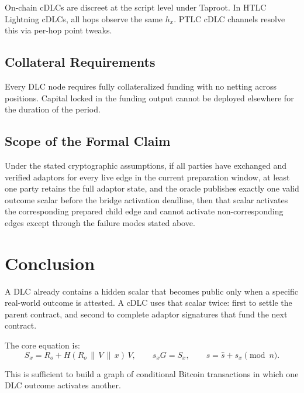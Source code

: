 \documentclass[11pt,a4paper]{article}
\theoremstyle{claimstyle}
\begin{document}
On-chain cDLCs are discreet at the script level under Taproot. In HTLC
Lightning cDLCs, all hops observe the same $h_x$. PTLC cDLC channels resolve
this via per-hop point tweaks.

\subsection{Collateral Requirements}

Every DLC node requires fully collateralized funding with no netting across
positions. Capital locked in the funding output cannot be deployed elsewhere for
the duration of the period.

\subsection{Scope of the Formal Claim}

Under the stated cryptographic assumptions, if all parties have exchanged and
verified adaptors for every live edge in the current preparation window, at
least one party retains the full adaptor state, and the oracle publishes exactly
one valid outcome scalar before the bridge activation deadline, then that scalar
activates the corresponding prepared child edge and cannot activate
non-corresponding edges except through the failure modes stated above.

\section{Conclusion}

A DLC already contains a hidden scalar that becomes public only when a specific
real-world outcome is attested. A cDLC uses that scalar twice: first to settle
the parent contract, and second to complete adaptor signatures that fund the
next contract.

The core equation is:
\[
  S_x = R_o + H(R_o \,\|\, V \,\|\, x)\,V,\qquad
  s_x G = S_x,\qquad
  s = \hat{s} + s_x \pmod{n}.
\]

This is sufficient to build a graph of conditional Bitcoin transactions in
which one DLC outcome activates another.
\end{document}
